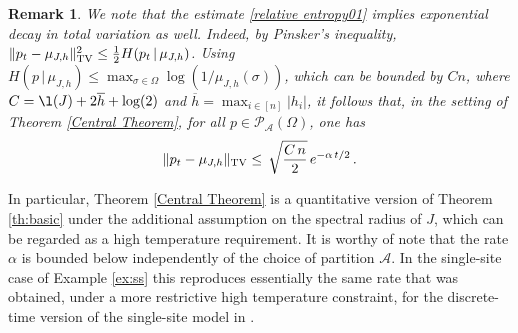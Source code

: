 \documentclass[11pt,reqno]{amsart}
\numberwithin{equation}{section}
\numberwithin{figure}{section}
\newtheorem{remark}[theorem]{Remark}
\newcommand{\1}{\mathds{1}}
\let\a=\alpha \let\b=\beta \let\g=\gamma \let\d=\delta
\let\si=\sigma
\let\O=\Omega
\newcommand{\cA}{\ensuremath{\mathcal A}}
\newcommand{\cP}{\ensuremath{\mathcal P}}
\begin{document}
\begin{remark}\label{rem:pinsk}
We note that the estimate \eqref{relative entropy01} implies exponential decay in total variation as well. Indeed,  by Pinsker's inequality, 
$\|p_t-\mu_{J,h}\|^2_{\rm TV} \le\frac12 H(p_t\,|\,\mu_{J,h})$. Using $H(p\,|\,\mu_{J,h})\le \max_{\si\in\O}\log (1/\mu_{J,h}(\si))$, which can be bounded by $Cn$, where $
C=\l(J) + 2\overline{h}+\log(2)$ and $\overline{h}=\max_{i\in [n]} |h_i|$, it follows that, in the setting of Theorem \ref{Central Theorem}, for all $p\in\cP_\cA(\O)$, one has
  \begin{equation}\label{eq:tvbou}
 \|p_t-\mu_{J,h}\|_{\rm TV} \le  \,\sqrt{\frac{C\, n}2}\,e^{-\a\, t/2}\,.
 \end{equation}
 \end{remark}
In particular, Theorem \ref{Central Theorem} is a quantitative version of Theorem \ref{th:basic} under the additional assumption on the spectral radius of $J$, which can be regarded as a high temperature requirement. It is worthy of note that the rate $\a$ is bounded below independently of the choice of partition $\cA$. In the single-site case of Example \ref{ex:ss} this reproduces essentially the same rate that was obtained,   under a more restrictive high temperature constraint, for the discrete-time version of the single-site model in \cite{AC2024nonlinear}.
\end{document}
